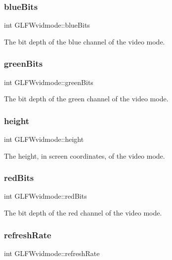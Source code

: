 \subsubsection{\texorpdfstring{blue\+Bits}{blueBits}}
{\footnotesize\ttfamily int G\+L\+F\+Wvidmode\+::blue\+Bits}

The bit depth of the blue channel of the video mode. \mbox{\label{struct_g_l_f_wvidmode_a292fdd281f3485fb3ff102a5bda43faa}} 
\subsubsection{\texorpdfstring{green\+Bits}{greenBits}}
{\footnotesize\ttfamily int G\+L\+F\+Wvidmode\+::green\+Bits}

The bit depth of the green channel of the video mode. \mbox{\label{struct_g_l_f_wvidmode_ac65942a5f6981695517437a9d571d03c}} 
\subsubsection{\texorpdfstring{height}{height}}
{\footnotesize\ttfamily int G\+L\+F\+Wvidmode\+::height}

The height, in screen coordinates, of the video mode. \mbox{\label{struct_g_l_f_wvidmode_a6066c4ecd251098700062d3b735dba1b}} 
\subsubsection{\texorpdfstring{red\+Bits}{redBits}}
{\footnotesize\ttfamily int G\+L\+F\+Wvidmode\+::red\+Bits}

The bit depth of the red channel of the video mode. \mbox{\label{struct_g_l_f_wvidmode_a791bdd6c7697b09f7e9c97054bf05649}} 
\subsubsection{\texorpdfstring{refresh\+Rate}{refreshRate}}
{\footnotesize\ttfamily int G\+L\+F\+Wvidmode\+::refresh\+Rate}

